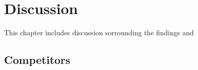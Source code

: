 \chapter{Discussion}
This chapter includes discussion sorrounding the findings and 
\section{Competitors}

\section{}